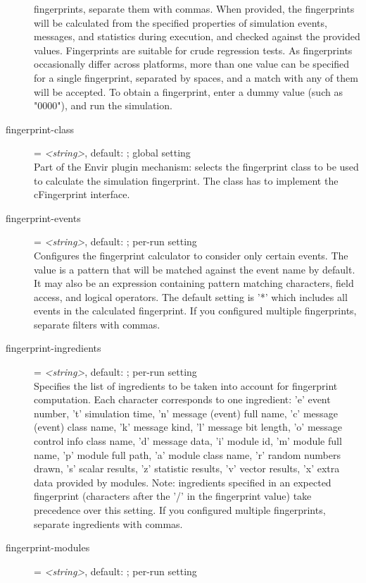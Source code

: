 \begin{description}
    fingerprints, separate them with commas. When provided, the fingerprints
    will be calculated from the specified properties of simulation events,
    messages, and statistics during execution, and checked against the provided
    values. Fingerprints are suitable for crude regression tests. As
    fingerprints occasionally differ across platforms, more than one value can
    be specified for a single fingerprint, separated by spaces, and a match
    with any of them will be accepted. To obtain a fingerprint, enter a dummy
    value (such as "0000"), and run the simulation.
\item[fingerprint-class] = \textit{<string>}, default: ; global setting \\
    Part of the Envir plugin mechanism: selects the fingerprint class to be
    used to calculate the simulation fingerprint. The class has to implement
    the cFingerprint interface.
\item[fingerprint-events] = \textit{<string>}, default: \ttt{*}; per-run setting \\
    Configures the fingerprint calculator to consider only certain events. The
    value is a pattern that will be matched against the event name by default.
    It may also be an expression containing pattern matching characters, field
    access, and logical operators. The default setting is '*' which includes
    all events in the calculated fingerprint. If you configured multiple
    fingerprints, separate filters with commas.
\item[fingerprint-ingredients] = \textit{<string>}, default: ; per-run setting \\
    Specifies the list of ingredients to be taken into account for fingerprint
    computation. Each character corresponds to one ingredient: 'e' event
    number, 't' simulation time, 'n' message (event) full name, 'c' message
    (event) class name, 'k' message kind, 'l' message bit length, 'o' message
    control info class name, 'd' message data, 'i' module id, 'm' module full
    name, 'p' module full path, 'a' module class name, 'r' random numbers
    drawn, 's' scalar results, 'z' statistic results, 'v' vector results, 'x'
    extra data provided by modules. Note: ingredients specified in an expected
    fingerprint (characters after the '/' in the fingerprint value) take
    precedence over this setting. If you configured multiple fingerprints,
    separate ingredients with commas.
\item[fingerprint-modules] = \textit{<string>}, default: \ttt{*}; per-run setting \\

\end{description}
